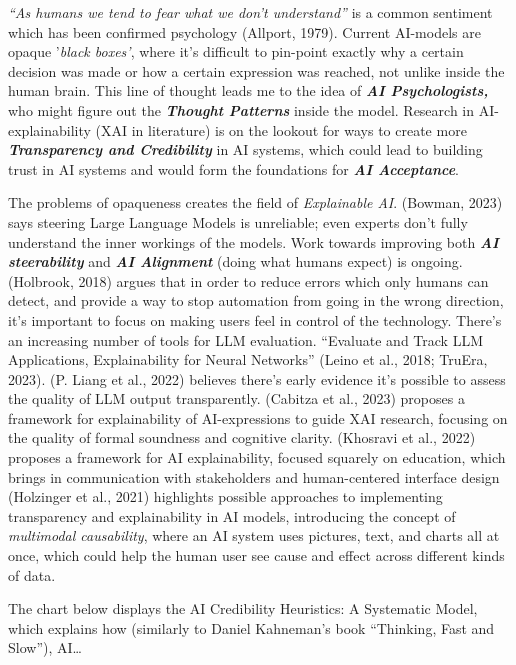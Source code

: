 \documentclass[
  letterpaper,
  DIV=11,
  numbers=noendperiod]{scrartcl}
\begin{document}
\emph{``As humans we tend to fear what we don't understand''} is a
common sentiment which has been confirmed psychology (Allport, 1979).
Current AI-models are opaque '\emph{black boxes'}, where it's difficult
to pin-point exactly why a certain decision was made or how a certain
expression was reached, not unlike inside the human brain. This line of
thought leads me to the idea of \textbf{\emph{AI Psychologists,}} who
might figure out the \textbf{\emph{Thought Patterns}} inside the model.
Research in AI-explainability (XAI in literature) is on the lookout for
ways to create more \textbf{\emph{Transparency and Credibility}} in AI
systems, which could lead to building trust in AI systems and would form
the foundations for \textbf{\emph{AI Acceptance}}.

The problems of opaqueness creates the field of \emph{Explainable AI}.
(Bowman, 2023) says steering Large Language Models is unreliable; even
experts don't fully understand the inner workings of the models. Work
towards improving both \textbf{\emph{AI steerability}} and
\textbf{\emph{AI Alignment}} (doing what humans expect) is ongoing.
(Holbrook, 2018) argues that in order to reduce errors which only humans
can detect, and provide a way to stop automation from going in the wrong
direction, it's important to focus on making users feel in control of
the technology. There's an increasing number of tools for LLM
evaluation. ``Evaluate and Track LLM Applications, Explainability for
Neural Networks'' (Leino et al., 2018; TruEra, 2023). (P. Liang et al.,
2022) believes there's early evidence it's possible to assess the
quality of LLM output transparently. (Cabitza et al., 2023) proposes a
framework for explainability of AI-expressions to guide XAI research,
focusing on the quality of formal soundness and cognitive clarity.
(Khosravi et al., 2022) proposes a framework for AI explainability,
focused squarely on education, which brings in communication with
stakeholders and human-centered interface design (Holzinger et al.,
2021) highlights possible approaches to implementing transparency and
explainability in AI models, introducing the concept of \emph{multimodal
causability}, where an AI system uses pictures, text, and charts all at
once, which could help the human user see cause and effect across
different kinds of data.

The chart below displays the AI Credibility Heuristics: A Systematic
Model, which explains how (similarly to Daniel Kahneman's book
``Thinking, Fast and Slow''), AI\ldots{}
\end{document}
